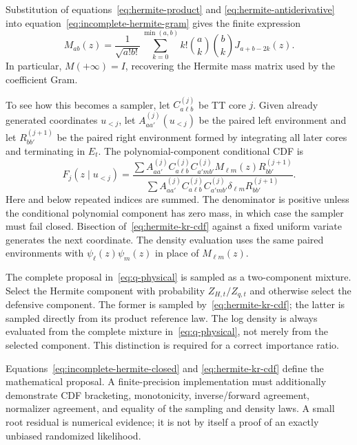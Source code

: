 \documentclass[11pt]{article}
\begin{document}
Substitution of equations~\eqref{eq:hermite-product} and
\eqref{eq:hermite-antiderivative} into
equation~\eqref{eq:incomplete-hermite-gram} gives the finite expression
\begin{equation}\label{eq:incomplete-hermite-closed}
M_{ab}(z)=\frac{1}{\sqrt{a!b!}}
\sum_{k=0}^{\min(a,b)}
k!\binom{a}{k}\binom{b}{k}J_{a+b-2k}(z).
\end{equation}
In particular, $M(+\infty)=I$, recovering the Hermite mass matrix used by the
coefficient Gram.

To see how this becomes a sampler, let
$C^{(j)}_{a\ell b}$ be TT core $j$. Given already generated coordinates
$u_{<j}$, let $A^{(j)}_{aa'}(u_{<j})$ be the paired left environment and let
$R^{(j+1)}_{bb'}$ be the paired right environment formed by integrating all
later cores and terminating in $E_t$. The polynomial-component conditional
CDF is
\begin{equation}\label{eq:hermite-kr-cdf}
F_j(z\mid u_{<j})=
\frac{
\sum A^{(j)}_{aa'}C^{(j)}_{a\ell b}C^{(j)}_{a'mb'}
M_{\ell m}(z)R^{(j+1)}_{bb'}
}{
\sum A^{(j)}_{aa'}C^{(j)}_{a\ell b}C^{(j)}_{a'mb'}
\delta_{\ell m}R^{(j+1)}_{bb'}
}.
\end{equation}
Here and below repeated indices are summed. The denominator is positive unless
the conditional polynomial component has zero mass, in which case the sampler
must fail closed. Bisection of~\eqref{eq:hermite-kr-cdf} against a fixed
uniform variate generates the next coordinate. The density evaluation uses
the same paired environments with $\psi_\ell(z)\psi_m(z)$ in place of
$M_{\ell m}(z)$.

The complete proposal in~\eqref{eq:q-physical} is sampled as a two-component
mixture. Select the Hermite component with probability
$Z_{H,t}/Z_{q,t}$ and otherwise select the defensive component. The former is
sampled by~\eqref{eq:hermite-kr-cdf}; the latter is sampled directly from its
product reference law. The log density is always evaluated from the complete
mixture in~\eqref{eq:q-physical}, not merely from the selected component. This
distinction is required for a correct importance ratio.

Equations~\eqref{eq:incomplete-hermite-closed} and
\eqref{eq:hermite-kr-cdf} define the mathematical proposal. A
finite-precision implementation must additionally demonstrate CDF bracketing,
monotonicity, inverse/forward agreement, normalizer agreement, and equality of
the sampling and density laws. A small root residual is numerical evidence; it
is not by itself a proof of an exactly unbiased randomized likelihood.
\end{document}
